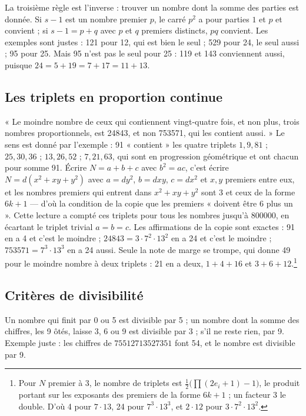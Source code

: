 \documentclass[11pt,a4paper]{article}
\begin{document}
La troisième règle est l'inverse : trouver un nombre dont la somme des parties
est donnée. Si $s - 1$ est un nombre premier $p$, le carré $p^2$ a pour parties
$1$ et $p$ et convient ; si $s - 1 = p + q$ avec $p$ et $q$ premiers distincts,
$pq$ convient. Les exemples sont justes : 121 pour 12, qui est bien le seul ;
529 pour 24, le seul aussi ; 95 pour 25. Mais 95 n'est pas le seul pour 25 : 119
et 143 conviennent aussi, puisque $24 = 5 + 19 = 7 + 17 = 11 + 13$.

\subsection*{Les triplets en proportion continue}

« Le moindre nombre de ceux qui contiennent vingt-quatre fois, et non plus, trois
nombres proportionnels, est 24843, et non 753571, qui les contient aussi. » Le
sens est donné par l'exemple : 91 « contient » les quatre triplets $1, 9, 81$ ;
$25, 30, 36$ ; $13, 26, 52$ ; $7, 21, 63$, qui sont en progression géométrique et
ont chacun pour somme 91. Écrire $N = a + b + c$ avec $b^2 = ac$, c'est écrire
$N = d(x^2 + xy + y^2)$ avec $a = dy^2$, $b = dxy$, $c = dx^2$ et $x, y$ premiers
entre eux, et les nombres premiers qui entrent dans $x^2 + xy + y^2$ sont 3 et
ceux de la forme $6k+1$ — d'où la condition de la copie que les premiers
« doivent être 6 plus un ». Cette lecture a compté ces triplets pour tous les
nombres jusqu'à 800000, en écartant le triplet trivial $a = b = c$. Les
affirmations de la copie sont exactes : 91 en a 4 et c'est le moindre ;
$24843 = 3 \cdot 7^2 \cdot 13^2$ en a 24 et c'est le moindre ; $753571 =
7^3 \cdot 13^3$ en a 24 aussi. Seule la note de marge se trompe, qui donne 49
pour le moindre nombre à deux triplets : 21 en a deux, $1 + 4 + 16$ et
$3 + 6 + 12$.\footnote{Pour $N$ premier à 3, le nombre de triplets est
$\frac12\bigl(\prod(2e_i + 1) - 1\bigr)$, le produit portant sur les exposants
des premiers de la forme $6k+1$ ; un facteur 3 le double. D'où 4 pour
$7 \cdot 13$, 24 pour $7^3 \cdot 13^3$, et $2 \cdot 12$ pour
$3 \cdot 7^2 \cdot 13^2$.}

\subsection*{Critères de divisibilité}

Un nombre qui finit par 0 ou 5 est divisible par 5 ; un nombre dont la somme des
chiffres, les 9 ôtés, laisse 3, 6 ou 9 est divisible par 3 ; s'il ne reste rien,
par 9. Exemple juste : les chiffres de $75512713527351$ font 54, et le nombre est
divisible par 9.
\end{document}
